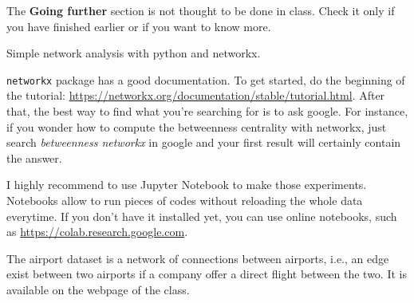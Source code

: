 \documentclass[addpoints]{exam}
\newcommand{\code}[1]{\colorbox{light-gray}{\texttt{#1}}}
\begin{document}
\begin{center}
\end{center}
\begin{tcolorbox}[colback=black!5!white,colframe=white!75!black]
The \textbf{Going further} section is not thought to be done in class. Check it only if you have finished earlier or if you want to know more.
\end{tcolorbox}


\begin{questions}
\question Simple network analysis with python and networkx.
\begin{tcolorbox}[colback=blue!5!white,colframe=blue!75!black]
  \code{networkx} package has a good documentation. To get started, do the beginning of the tutorial: \url{https://networkx.org/documentation/stable/tutorial.html}. After that, the best way to find what you're searching for is to ask google. For instance, if you wonder how to compute the betweenness centrality with networkx, just search \textit{betweenness networkx} in google and your first result will certainly contain the answer.
\end{tcolorbox}
\begin{tcolorbox}[colback=blue!5!white,colframe=blue!75!black]
 I highly recommend to use Jupyter Notebook to make those experiments. Notebooks allow to run pieces of codes without reloading the whole data everytime. If you don't have it installed yet, you can use online notebooks, such as \url{https://colab.research.google.com}.
\end{tcolorbox}
\begin{tcolorbox}[colback=black!5!white,colframe=white!75!black]
  The airport dataset is a network of connections between airports, i.e., an edge exist between two airports if a company offer a direct flight between the two. It is available on the webpage of the class.
\end{tcolorbox}
\end{questions}
\end{document}
